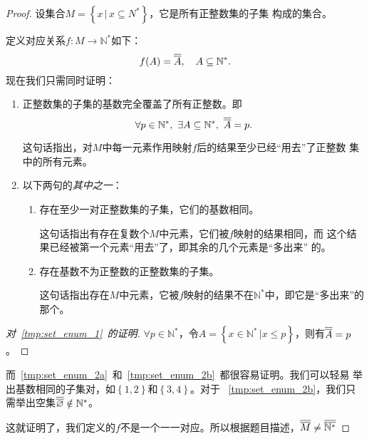 \begin{proof}
    设集合$M=\left\{ x\,|\, x\subseteq N^\ast \right\}$，它是所有正整数集的子集
    构成的集合。

    定义对应关系$f:M\rightarrow \mathbb{N}^\ast$如下：
    \[
        f(A) = \overline{\overline{{A}}},\quad A\subseteq \mathbb{N}^\ast.
    \]
    现在我们只需同时证明：
    \begin{enumerate}[label=(\roman*)]
        \item 正整数集的子集的基数完全覆盖了所有正整数。即
            \[
                \forall p\in \mathbb{N}^\ast,\ \exists A\subseteq \mathbb{N}
                ^\ast,\ \overline{\overline{{A}}} = p.
            \] \label{tmp:set_enum_1}

            这句话指出，对$M$中每一元素作用映射$f$后的结果至少已经“用去”了正整数
            集中的所有元素。

        \item 以下两句的\emph{其中之一}：
            \begin{enumerate}
                \item 存在至少一对正整数集的子集，它们的基数相同。\label{tmp:set_enum_2a}
                    
                    这句话指出有存在复数个$M$中元素，它们被$f$映射的结果相同，而
                    这个结果已经被第一个元素“用去”了，即其余的几个元素是“多出来”
                    的。

                \item 存在基数不为正整数的正整数集的子集。\label{tmp:set_enum_2b}

                    这句话指出存在$M$中元素，它被$f$映射的结果不在$\mathbb{N}
                    ^\ast$中，即它是“多出来”的那个。
            \end{enumerate}
    \end{enumerate}
    \begin{proof}[对~\ref{tmp:set_enum_1}~的证明]
        $\forall p \in \mathbb{N}^\ast$，令$A = \left\{ x\in\mathbb{N}^\ast\,
        |x \le p\right\} $，则有$\overline{\overline{{A}}}=p$。
    \end{proof}
    而~\ref{tmp:set_enum_2a}~和~\ref{tmp:set_enum_2b}~都很容易证明。我们可以轻易
    举出基数相同的子集对，如$\left\{ 1,2 \right\}$和$\left\{ 3,4 \right\}$。对于
    ~\ref{tmp:set_enum_2b}，我们只需举出空集$\overline{\overline{{\varnothing}}} \notin 
    \mathbb{N}^\ast$。

    这就证明了，我们定义的$f$不是一个一一对应。所以根据题目描述，$\overline{\overline{{M}}}
    \neq\overline{\overline{{\mathbb{N}^\ast}}}$
\end{proof}

